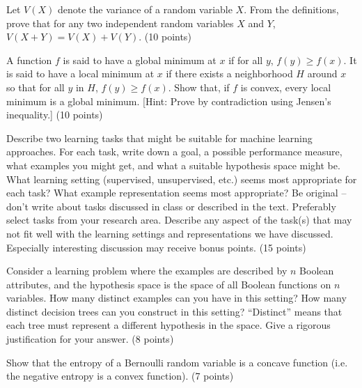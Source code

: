 \documentclass[fleqn]{homework}
\begin{document}
  \maketitle

  \begin{problem}{1}
    \begin{question}
      Let $V(X)$ denote the variance of a random variable $X$.  From the
      definitions, prove that for any two independent random variables $X$ and
      $Y$, $V(X + Y) = V(X) + V(Y)$. (10 points)
    \end{question}
  \end{problem}

  \begin{problem}{2}
    \begin{question}
      A function $f$ is said to have a global minimum at $x$ if for all $y$,
      $f(y) \ge f(x)$.  It is said to have a local minimum at $x$ if there
      exists a neighborhood $H$ around $x$ so that for all $y$ in $H$,
      $f(y) \ge f(x)$.  Show that, if $f$ is convex, every local minimum is a
      global minimum.  [Hint: Prove by contradiction using Jensen's inequality.]
      (10 points)
    \end{question}
  \end{problem}

  \begin{problem}{3}
    \begin{question}
      Describe two learning tasks that might be suitable for machine learning
      approaches.  For each task, write down a goal, a possible performance
      measure, what examples you might get, and what a suitable hypothesis space
      might be.  What learning setting (supervised, unsupervised, etc.) seems
      most appropriate for each task?  What example representation seems most
      appropriate?  Be original -- don't write about tasks discussed in class or
      described in the text.  Preferably select tasks from your research area.
      Describe any aspect of the task(s) that may not fit well with the learning
      settings and representations we have discussed.  Especially interesting
      discussion may receive bonus points. (15 points)
    \end{question}
  \end{problem}

  \begin{problem}{4}
    \begin{question}
      Consider a learning problem where the examples are described by $n$
      Boolean attributes, and the hypothesis space is the space of all Boolean
      functions on $n$ variables.  How many distinct examples can you have in
      this setting?  How many distinct decision trees can you construct in this
      setting?  ``Distinct'' means that each tree must represent a different
      hypothesis in the space.  Give a rigorous justification for your
      answer. (8 points)
    \end{question}
  \end{problem}

  \begin{problem}{5}
    \begin{question}
      Show that the entropy of a Bernoulli random variable is a concave function
      (i.e. the negative entropy is a convex function). (7 points)
    \end{question}
  \end{problem}
\end{document}
